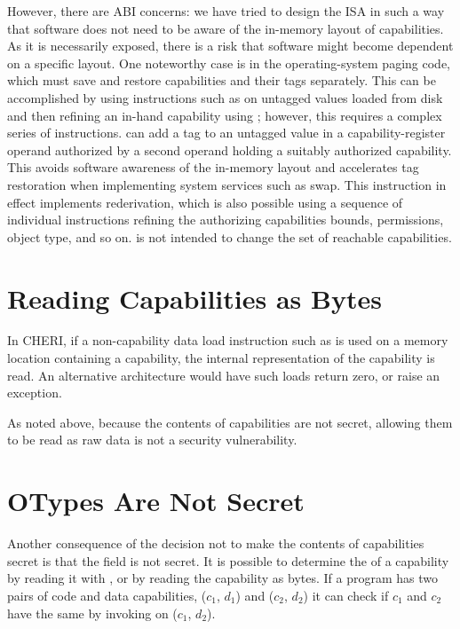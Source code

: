 However, there are ABI concerns: we have tried to design the ISA in such a
way that software does not need to be aware of the in-memory layout of
capabilities.  As it is necessarily exposed, there is a risk that software
might become dependent on a specific layout.
One noteworthy case is in the operating-system paging code, which must
save and restore capabilities and their tags separately.
This can be
accomplished by using instructions such as  on untagged
values loaded from disk and then refining an in-hand capability using
; however,
this requires a complex series of instructions.
 can add a
tag to an untagged value in a capability-register operand authorized by a
second operand holding a suitably authorized capability.
This avoids software
awareness of the in-memory layout and accelerates tag restoration
when implementing system services such as swap.
This instruction in effect implements rederivation, which is also possible
using a sequence of individual instructions refining the authorizing
capabilities bounds, permissions, object type, and so on.
 is not intended to change the set of reachable
capabilities.

\section{Reading Capabilities as Bytes}

In CHERI, if a non-capability data load instruction such as  is used
on a memory location containing a capability, the internal representation
of the capability is read. An alternative architecture would have
such loads return zero, or raise an exception.

As noted above,
because the contents of capabilities are not secret, allowing them to be
read as raw data is not a security vulnerability.

\section{OTypes Are Not Secret}

Another consequence of the decision not to make the contents of capabilities secret
is that the \cotype{} field is not secret. It is possible to determine the
\cotype{} of a capability by reading it with , or by
reading the capability as bytes. If a program has two pairs of code and data
capabilities, ($c_1$, $d_1$) and ($c_2$, $d_2$) it can check if $c_1$ and $c_2$
have the same \cotype{} by invoking  on ($c_1$, $d_2$).

